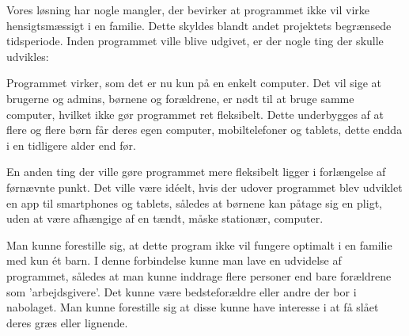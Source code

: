 Vores løsning har nogle mangler, der bevirker at programmet ikke vil virke hensigtsmæssigt i en familie. Dette skyldes blandt andet projektets begrænsede tidsperiode. Inden programmet ville blive udgivet, er der nogle ting der skulle udvikles:

Programmet virker, som det er nu kun på en enkelt computer. Det vil sige at brugerne og admins, børnene og forældrene, er nødt til at bruge samme computer, hvilket ikke gør programmet ret fleksibelt. Dette underbygges af at flere og flere børn får deres egen computer, mobiltelefoner og tablets, dette endda i en tidligere alder end før.\cite{MobilAlder}

En anden ting der ville gøre programmet mere fleksibelt ligger i forlængelse af førnævnte punkt. Det ville være idéelt, hvis der udover programmet blev udviklet en app til smartphones og tablets, således at børnene kan påtage sig en pligt, uden at være afhængige af en tændt, måske stationær, computer.

Man kunne forestille sig, at dette program ikke vil fungere optimalt i en familie med kun ét barn. I denne forbindelse kunne man lave en udvidelse af programmet, således at man kunne inddrage flere personer end bare forældrene som 'arbejdsgivere'. Det kunne være bedsteforældre eller andre der bor i nabolaget. Man kunne forestille sig at disse kunne have interesse i at få slået deres græs eller lignende.

